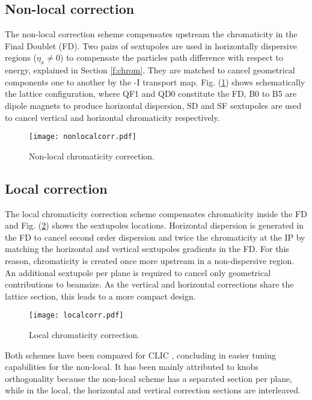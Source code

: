 \subsection{Non-local correction}
The non-local correction scheme \cite{Brown:1988} compensates upstream the chromaticity in the Final Doublet (FD). Two pairs of sextupoles are used in horizontally dispersive regions ($\eta_x\neq0$) to compensate the particles path difference with respect to energy, explained in Section \ref{f:chrom}. They are matched to cancel geometrical components one to another by the -I transport map. Fig. (\ref{f-Non-local}) shows schematically the lattice configuration, where QF1 and QD0 constitute the FD, B0 to B5 are dipole magnets to produce horizontal dispersion, SD and SF sextupoles are used to cancel vertical and horizontal chromaticity respectively.\par
\begin{figure}[!htb]
   \centering
   \texttt{[image: nonlocalcorr.pdf]}
   \caption{Non-local chromaticity correction.}
   \label{f-Non-local}
\end{figure}
\subsection{Local correction}
The local chromaticity correction scheme \cite{Raimondi:2000} compensates chromaticity inside the FD and Fig. (\ref{f-local}) shows the sextupoles locations. Horizontal dispersion is generated in the FD to cancel second order dispersion and twice the chromaticity at the IP by matching the horizontal and vertical sextupoles gradients in the FD. For this reason,  chromaticity is created once more upstream in a non-dispersive region. An additional sextupole per plane is required to cancel only geometrical contributions to beamsize. As the vertical and horizontal corrections share the lattice section, this leads to a more compact design.\par
\begin{figure}[!htb]
   \centering
   \texttt{[image: localcorr.pdf]}
   \caption{Local chromaticity correction.}
   \label{f-local}
\end{figure}
Both schemes have been compared for CLIC \cite{PhysRevSTAB.17.101001}, concluding in %
easier tuning capabilities for the non-local. It has been mainly attributed to knobs orthogonality because the non-local scheme has a separated section per plane, while in the local, the horizontal and vertical correction sections are interleaved.\par
